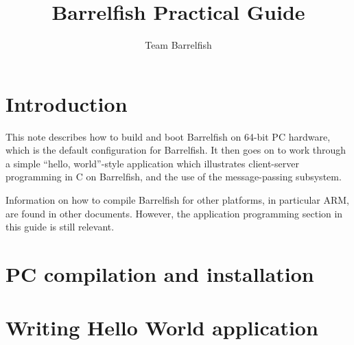 \documentclass[a4paper,twoside]{report} %
\title{Barrelfish Practical Guide}   %
\author{Team Barrelfish}	%
\begin{document}
\maketitle

%
%

\tableofcontents		%


\chapter{Introduction}

This note describes how to build and boot Barrelfish on 64-bit PC
hardware, which is the default configuration for Barrelfish.  It then
goes on to work through a simple ``hello, world''-style application
which illustrates client-server programming in C on Barrelfish, and
the use of the message-passing subsystem.

Information on how to compile Barrelfish for other platforms, in
particular ARM, are found in other documents.  However, the
application programming section in this guide is still relevant.

\chapter{PC compilation and installation}\label{chap:compilationInstallation}


\chapter{Writing Hello World application}\label{chap:helloWorldApp}




\end{document}
